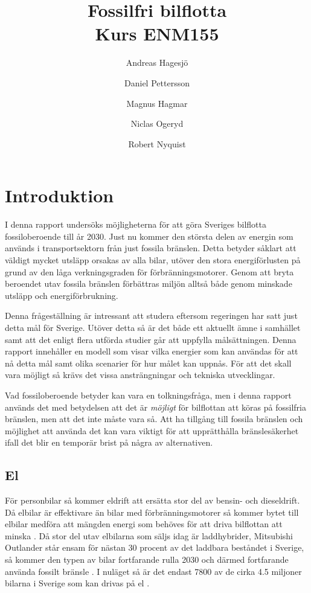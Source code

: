 \documentclass[a4paper,11pt,fleqn, titlepage]{article}
\author{Andreas Hagesjö \and Daniel Pettersson \and
Magnus Hagmar \and Niclas Ogeryd \and Robert Nyquist}
\title{Fossilfri bilflotta \\ Kurs ENM155}
\begin{document}
\maketitle

\section{Introduktion}
I denna rapport undersöks möjligheterna för att göra Sveriges bilflotta
fossiloberoende till år 2030. Just nu kommer den största delen av energin
som används i transportsektorn från just fossila bränslen. Detta betyder
såklart att väldigt mycket utsläpp orsakas av alla bilar, utöver den stora
energiförlusten på grund av den låga verkningsgraden för
förbränningsmotorer. Genom att bryta beroendet utav fossila bränslen
förbättras miljön alltså både genom minskade utsläpp och energiförbrukning.

Denna frågeställning är intressant att studera eftersom regeringen har satt
just detta mål för Sverige. Utöver detta så är det både ett aktuellt ämne
i samhället samt att det enligt flera utförda studier går att uppfylla
målsättningen. Denna rapport innehåller en modell som visar vilka energier
som kan användas för att nå detta mål samt olika scenarier för hur målet
kan uppnås. För att det skall vara möjligt så krävs det vissa
ansträngningar och tekniska utvecklingar.

Vad fossiloberoende betyder kan vara en tolkningsfråga, men i denna rapport
används det med betydelsen att det är \emph{möjligt} för bilflottan att
köras på fossilfria bränslen, men att det inte måste vara så. Att ha tillgång
till fossila bränslen och möjlighet att använda det kan vara viktigt för
att upprätthålla bränslesäkerhet ifall det blir en temporär brist på
några av alternativen.

\subsection{El}

För personbilar så kommer eldrift att ersätta stor del av bensin- och
dieseldrift. Då elbilar är effektivare än bilar med förbränningsmotorer så
kommer bytet till elbilar medföra att mängden energi som behöves för att
driva bilflottan att minska \cite[s.~25]{elforsk}. Då stor del utav
elbilarna som säljs idag är laddhybrider, Mitsubishi Outlander står ensam
för nästan 30 procent av det laddbara beståndet i Sverige, så kommer den
typen av bilar fortfarande rulla 2030 och därmed fortfarande använda
fossilt bränsle \cite{laddbarafordon}. I nuläget så är det endast
7800 av de cirka 4.5 miljoner bilarna i Sverige som kan drivas på
el \cite{fordonsstatistik}.\\
\end{document}
